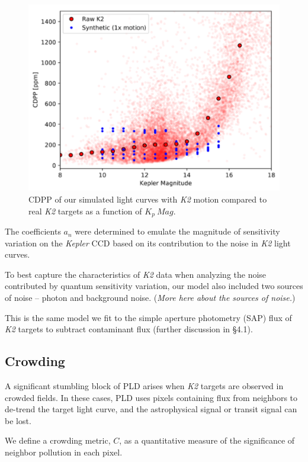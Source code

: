 \documentclass[12pt,preprint]{emulateapj}
\begin{document}
\begin{figure}[h]
	\centering
	\includegraphics[width=1.0\linewidth]{1xmotion.png}
	\caption{CDPP of our simulated light curves with \textit{K2} motion compared to real \textit{K2} targets as a function of $K_p\ Mag$.}
	\label{fig:nomotion}
\end{figure}

The coefficients $a_n$ were determined to emulate the magnitude of sensitivity variation on the \textit{Kepler} CCD based on its contribution to the noise in \textit{K2} light curves.

To best capture the characteristics of \textit{K2} data when analyzing the noise contributed by quantum sensitivity variation, our model also included two sources of noise -- photon and background noise. (\textit{More here about the sources of noise.})

This is the same model we fit to the simple aperture photometry (SAP) flux of \textit{K2} targets to subtract contaminant flux (further discussion in \S 4.1).

\subsection{Crowding}

A significant stumbling block of PLD arises when \textit{K2} targets are observed in crowded fields. In these cases, PLD uses pixels containing flux from neighbors to de-trend the target light curve, and the astrophysical signal or transit signal can be lost.

We define a crowding metric, $C$, as a quantitative measure of the significance of neighbor pollution in each pixel.
\end{document}
